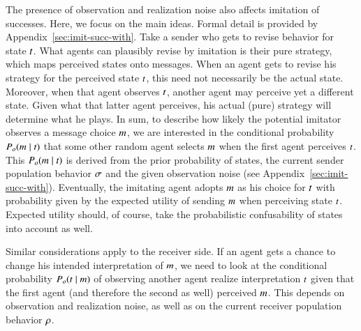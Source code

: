 \documentclass[fleqn,reqno,10pt]{article}
\begin{document}
The presence of observation and realization noise also affects imitation of successes. Here, we
focus on the main ideas. Formal detail is provided by Appendix~\ref{sec:imit-succ-with}. Take a
sender who gets to revise behavior for state $t$. What agents can plausibly revise by
imitation is their pure strategy, which maps perceived states onto messages. When an agent gets
to revise his strategy for the perceived state $t$, this need not necessarily be the
actual state. Moreover, when that agent observes $t$, another agent may perceive yet a
different state. Given what that latter agent perceives, his actual (pure) strategy will
determine what he plays. In sum, to describe how likely the potential imitator observes a
message choice $m$, we are interested in the conditional probability
$P_o(m \mid t)$ that some other random agent selects $m$ when the first
agent perceives $t$. This $P_o(m \mid t)$ is derived from the prior
probability of states, the current sender population behavior $\sigma$ and the given
observation noise (see Appendix~\ref{sec:imit-succ-with}). Eventually, the imitating agent adopts
$m$ as his choice for $t$ with probability given by the expected utility of sending
$m$ when perceiving state $t$. Expected utility should, of course, take the
probabilistic confusability of states into account as well.

Similar considerations apply to the receiver side. If an agent gets a chance to change his
intended interpretation of $m$, we need to look at the conditional probability
$P_o(t \mid m)$ of observing another agent realize interpretation $t$ given
that the first agent (and therefore the second as well) perceived $m$. This depends on
observation and realization noise, as well as on the current receiver population behavior
$\rho$.
\end{document}
